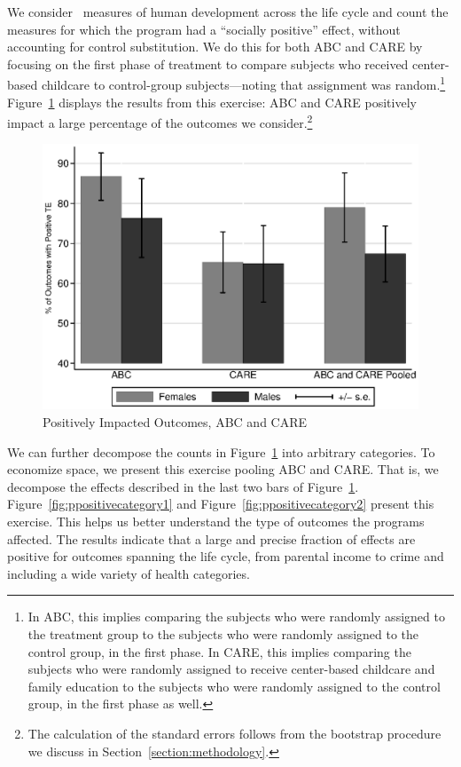 \noindent We consider \noutcomes\ measures of human development across the life cycle and count the measures for which the program had a ``socially positive'' effect, without accounting for control substitution. We do this for both ABC and CARE by focusing on the first phase of treatment to compare subjects who received center-based childcare to control-group subjects---noting that assignment was random.\footnote{In ABC, this implies comparing the subjects who were randomly assigned to the treatment group to the subjects who were randomly assigned to the control group, in the first phase. In CARE, this implies comparing the subjects who were randomly assigned to receive center-based childcare and family education to the subjects who were randomly assigned to the control group, in the first phase as well.} Figure~\ref{fig:ppositive} displays the results from this exercise: ABC and CARE positively impact a large percentage of the outcomes we consider.\footnote{The calculation of the standard errors follows from the bootstrap procedure we discuss in Section~\ref{section:methodology}.}

\begin{figure}[H]
		\caption{Positively Impacted Outcomes, ABC and CARE} \label{fig:ppositive}
		\includegraphics[width=.8\columnwidth]{output/itt_noctrl_all.eps}
\end{figure}

\noindent We can further decompose the counts in Figure~\ref{fig:ppositive} into arbitrary categories. To economize space, we present this exercise pooling ABC and CARE. That is, we decompose the effects described in the last two bars of Figure~\ref{fig:ppositive}. Figure~\ref{fig:ppositivecategory1} and Figure~\ref{fig:ppositivecategory2} present this exercise. This helps us better understand the type of outcomes the programs affected. The results indicate that a large and precise fraction of effects are positive for outcomes spanning the life cycle, from parental income to crime and including a wide variety of health categories.\\

